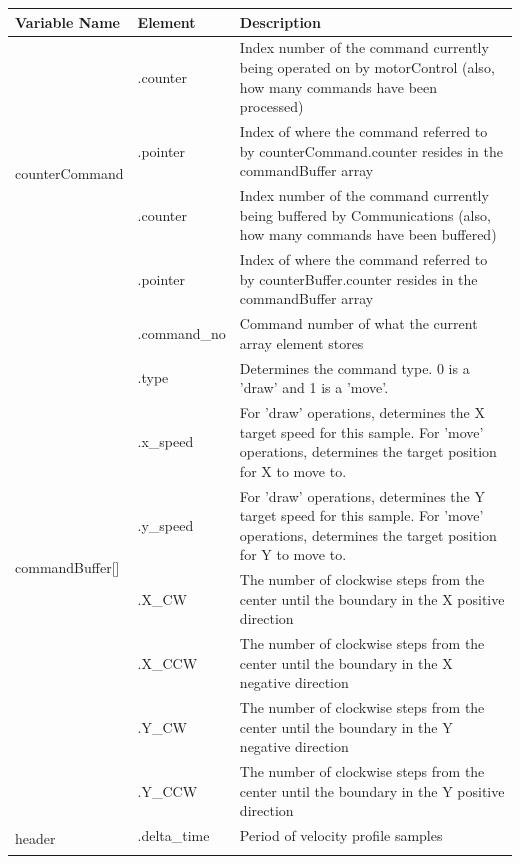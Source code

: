 	\begin{center}
			\begin{tabular}{|l|l|p{10cm}|}
				\hline
				Variable Name & Element & Description\\ \hline
				\multirow{4}{*}{counterCommand} & .counter & Index number of the command currently being operated on by motorControl (also, how many commands have been processed)\\ \cline{2-3}
					 & .pointer & Index of where the command referred to by counterCommand.counter resides in the commandBuffer array\\ \hline
				\multirow{4}{*}{counterBuffer} & .counter & Index number of the command currently being buffered by Communications (also, how many commands have been buffered)\\ \cline{2-3}
					 & .pointer & Index of where the command referred to by counterBuffer.counter resides in the commandBuffer array\\ \hline
				\multirow{8}{*}{commandBuffer[]} & .command\_no & Command number of what the current array element stores\\ \cline{2-3}
					& .type & Determines the command type. 0 is a 'draw' and 1 is a 'move'. \\ \cline{2-3}
					& .x\_speed & For 'draw' operations, determines the X target speed for this sample. For 'move' operations, determines the target position for X to move to. \\ \cline{2-3}
					& .y\_speed & For 'draw' operations, determines the Y target speed for this sample. For 'move' operations, determines the target position for Y to move to. \\ \hline
				\multirow{8}{*}{boundaries} & .X\_CW & The number of clockwise steps from the center until the boundary in the X positive direction\\ \cline{2-3}
					 & .X\_CCW & The number of clockwise steps from the center until the boundary in the X negative direction\\\cline{2-3}
					 & .Y\_CW & The number of clockwise steps from the center until the boundary in the Y negative direction\\ \cline{2-3}
					 & .Y\_CCW & The number of clockwise steps from the center until the boundary in the Y positive direction\\ \hline
				\multirow{6}{*}{header} & .delta\_time & Period of velocity profile samples\\ \cline{2-3}

\end{tabular}
\end{center}
